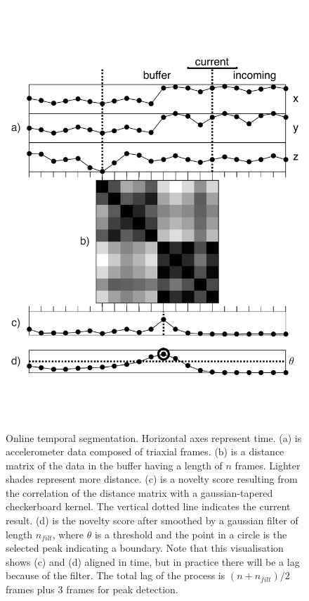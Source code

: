 \documentclass{nime-alternate_ADJ} %
\begin{document}
\begin{figure}[t!]
	\centering
		\includegraphics[trim={0.3cm 3.5cm 0.3cm 3.5cm}, clip=true, width=0.95\columnwidth]{fig_1_LO}
	\caption{Online temporal segmentation. Horizontal axes represent time. (a) is accelerometer data composed of triaxial frames. (b) is a distance matrix of the data in the buffer having a length of $n$ frames. Lighter shades represent more distance. (c) is a novelty score resulting from the correlation of the distance matrix with a gaussian-tapered checkerboard kernel. The vertical dotted line indicates the current result. (d) is the novelty score after smoothed by a gaussian filter of length $n_{filt}$, where $\theta$ is a threshold and the point in a circle is the selected peak indicating a  boundary. Note that this visualisation shows (c) and (d) aligned in time, but in practice there will be a lag because of the filter. The total lag of the process is $(n+ n_{filt})/2$ frames plus 3 frames for peak detection.}
	\label{fig_1}
\end{figure}
\end{document}

